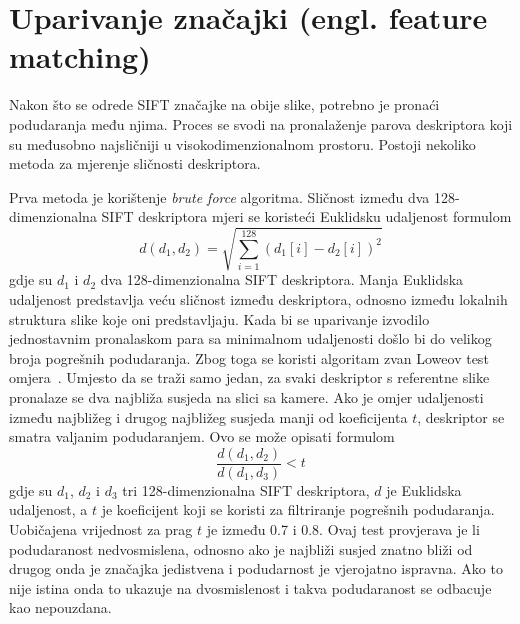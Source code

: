 \section{Uparivanje značajki (engl. feature matching)}

Nakon što se odrede SIFT značajke na obije slike, potrebno je pronaći podudaranja među njima. Proces se svodi na pronalaženje parova deskriptora koji su međusobno najsličniji u visokodimenzionalnom prostoru. Postoji nekoliko metoda za mjerenje sličnosti deskriptora.

Prva metoda je korištenje \textit{brute force} algoritma. Sličnost između dva 128-dimenzionalna SIFT deskriptora mjeri se koristeći Euklidsku udaljenost formulom
\begin{equation}
    d(d_1, d_2) = \sqrt{\sum_{i=1}^{128} (d_1[i] - d_2[i])^2}
\end{equation}
gdje su $d_1$ i $d_2$ dva 128-dimenzionalna SIFT deskriptora. Manja Euklidska udaljenost predstavlja veću sličnost između deskriptora, odnosno između lokalnih struktura slike koje oni predstavljaju.
Kada bi se uparivanje izvodilo jednostavnim pronalaskom para sa minimalnom udaljenosti došlo bi do velikog broja pogrešnih podudaranja. Zbog toga se koristi algoritam zvan Loweov test omjera~\cite{lowe2004sift}. Umjesto da se traži samo jedan, za svaki deskriptor s referentne slike pronalaze se dva najbliža susjeda na slici sa kamere. Ako je omjer udaljenosti između najbližeg i drugog najbližeg susjeda manji od koeficijenta $t$, deskriptor se smatra valjanim podudaranjem. Ovo se može opisati formulom
\begin{equation}
    \frac{d(d_1, d_2)}{d(d_1, d_3)} < t
\end{equation}
gdje su $d_1$, $d_2$ i $d_3$ tri 128-dimenzionalna SIFT deskriptora, $d$ je Euklidska udaljenost, a $t$ je koeficijent koji se koristi za filtriranje pogrešnih podudaranja. Uobičajena vrijednost za prag $t$ je između 0.7 i 0.8. Ovaj test provjerava je li podudaranost nedvosmislena, odnosno ako je najbliži susjed znatno bliži od drugog onda je značajka jedistvena i podudarnost je vjerojatno ispravna. Ako to nije istina onda to ukazuje na dvosmislenost i takva podudaranost se odbacuje kao nepouzdana.

